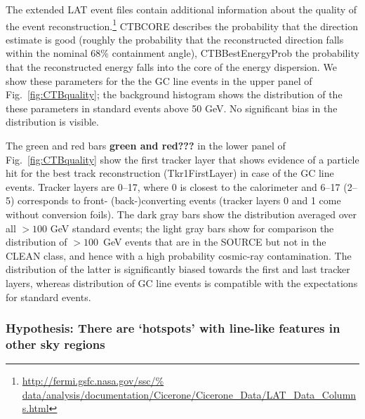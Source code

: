 \documentclass[aps,twocolumn,prd,superscriptaddress,showpacs,nofootinbib,fixfloat]{revtex4}
\begin{document}
The extended LAT event files contain additional information
about the quality of the event
reconstruction.\footnote{\url{http://fermi.gsfc.nasa.gov/ssc/%
data/analysis/documentation/Cicerone/Cicerone\_Data/LAT\_Data\_Columns.html}}
CTBCORE describes the probability that the direction estimate
is good (roughly the probability that the reconstructed
direction falls within the nominal 68\% containment angle),
CTBBestEnergyProb the probability that the reconstructed
energy falls into the core of the energy dispersion. We show
these parameters for the the GC line events in the upper
panel of Fig.~\ref{fig:CTBquality}; the background histogram
shows the distribution of the these parameters in standard
events above 50 GeV. No significant bias in the distribution
is visible.

The green and red bars {\bf green and red???} in the lower panel of
Fig.~\ref{fig:CTBquality} show the first tracker layer that
shows evidence of a particle hit for the best track
reconstruction (Tkr1FirstLayer) in case of the GC line
events.  Tracker layers are 0--17, where 0 is closest to the
calorimeter and 6--17 (2--5) corresponds to front-
(back-)converting events (tracker layers 0 and 1 come
without conversion foils). The dark gray bars show the
distribution averaged over all $>100$ GeV standard events;
the light gray bars
show for comparison the distribution of $>100$~GeV events that are in the SOURCE
but not in the CLEAN class, and hence with a high
probability cosmic-ray contamination. The distribution of the latter is significantly biased
towards the first and last tracker layers, whereas
distribution of GC line events is compatible with the
expectations for standard events.

\subsubsection{Hypothesis: There are `hotspots' with
line-like features in other sky regions}
\end{document}
